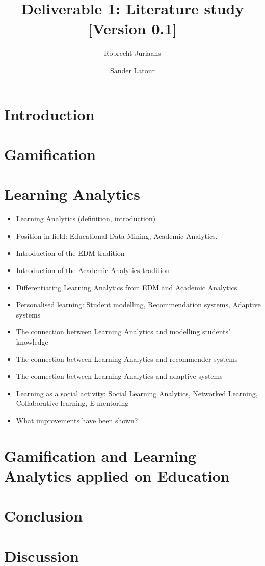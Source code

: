 \documentclass{article}
\title{Deliverable 1: Literature study \small{[Version 0.1]}}
\author{Robrecht Juriaans \and Sander Latour}
\begin{document}
\maketitle

\section{Introduction}

\section{Gamification}

\section{Learning Analytics}
\begin{itemize}
\item Learning Analytics (definition, introduction)
\item Position in field: Educational Data Mining, Academic Analytics.
\item Introduction of the EDM tradition
\item Introduction of the Academic Analytics tradition
\item Differentiating Learning Analytics from EDM and Academic Analytics
\item Personalised learning: Student modelling, Recommendation systems, Adaptive systems
\item The connection between Learning Analytics and modelling students’ knowledge
\item The connection between Learning Analytics and recommender systems
\item The connection between Learning Analytics and adaptive systems
\item Learning as a social activity: Social Learning Analytics, Networked Learning, Collaborative learning, E-mentoring
\item What improvements have been shown?
\end{itemize}


\section{Gamification and Learning Analytics applied on Education}

\section{Conclusion}

\section{Discussion}
\end{document}
